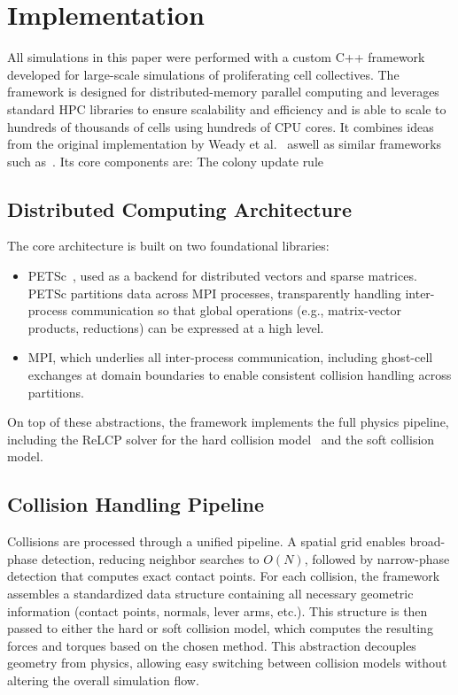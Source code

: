 \documentclass[conference]{IEEEtran}
\begin{document}
\newpage

\section{Implementation}

All simulations in this paper were performed with a custom C++ framework developed for large-scale simulations of proliferating cell collectives. The framework is designed for distributed-memory parallel computing and leverages standard HPC libraries to ensure scalability and efficiency and is able to scale to hundreds of thousands of cells using hundreds of CPU cores. It combines ideas from the original implementation by Weady et al.~\cite{Weady2024SM} aswell as similar frameworks such as~\cite{Tasora2008,Yan2019}. Its core components are:
The colony update rule
\subsection{Distributed Computing Architecture}

The core architecture is built on two foundational libraries:
\begin{itemize}
    \item PETSc~\cite{petsc-web-page}, used as a backend for distributed vectors and sparse matrices. PETSc partitions data across MPI processes, transparently handling inter-process communication so that global operations (e.g., matrix-vector products, reductions) can be expressed at a high level.
    \item MPI, which underlies all inter-process communication, including ghost-cell exchanges at domain boundaries to enable consistent collision handling across partitions.
\end{itemize}

On top of these abstractions, the framework implements the full physics pipeline, including the ReLCP solver for the hard collision model~\cite{Weady2024SM} and the soft collision model.


\subsection{Collision Handling Pipeline}

Collisions are processed through a unified pipeline. A spatial grid enables broad-phase detection, reducing neighbor searches to $O(N)$, followed by narrow-phase detection that computes exact contact points. For each collision, the framework assembles a standardized data structure containing all necessary geometric information (contact points, normals, lever arms, etc.). This structure is then passed to either the hard or soft collision model, which computes the resulting forces and torques based on the chosen method. This abstraction decouples geometry from physics, allowing easy switching between collision models without altering the overall simulation flow.
\end{document}
